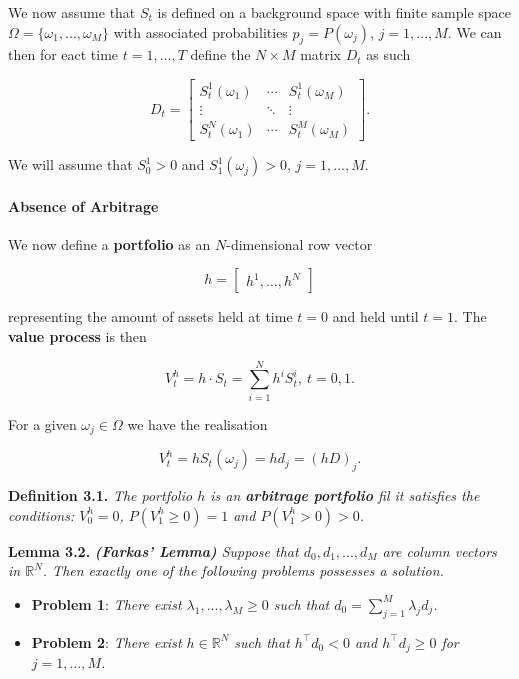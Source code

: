 \documentclass[
]{article}
\providecommand{\tightlist}{%
  \setlength{\itemsep}{0pt}\setlength{\parskip}{0pt}}
\begin{document}
We now assume that \(S_t\) is defined on a background space with finite
sample space \(\Omega = \{\omega_1,...,\omega_M\}\) with associated
probabilities \(p_j=P(\omega_j)\), \(j=1,...,M\). We can then for eact
time \(t=1,...,T\) define the \(N\times M\) matrix \(D_t\) as such

\[
D_t=\begin{bmatrix} S_t^1(\omega_1)&\cdots &S_t^1(\omega_M)\\
\vdots &\ddots & \vdots\\
S_t^N(\omega_1) &\cdots&S_t^M(\omega_M)\end{bmatrix}.
\]

We will assume that \(S_0^1>0\) and \(S_1^1(\omega_j)>0\),
\(j=1,...,M\).

\hypertarget{absence-of-arbitrage}{%
\paragraph{Absence of Arbitrage}\label{absence-of-arbitrage}}

We now define a \textbf{portfolio} as an \(N\)-dimensional row vector

\[
h=\begin{bmatrix} h^1, \dots,h^N\end{bmatrix}
\]

representing the amount of assets held at time \(t=0\) and held until
\(t=1\). The \textbf{value process} is then

\[
V^h_t=h\cdot S_t=\sum_{i=1}^N h^iS_t^i,\ t=0,1.\tag{3.1}
\]

For a given \(\omega_j\in\Omega\) we have the realisation

\[
V_t^h=hS_t(\omega_j)=hd_j=(hD)_j.
\]

\textbf{Definition 3.1.} \emph{The portfolio \(h\) is an
\textbf{arbitrage portfolio} fil it satisfies the conditions:
\(V_0^h=0\), \(P(V_1^h\ge 0)=1\) and \(P(V_1^h>0)>0\).}

\textbf{Lemma 3.2.} \emph{\textbf{(Farkas' Lemma)} Suppose that
\(d_0,d_1,...,d_M\) are column vectors in \(\mathbb{R}^N\). Then exactly
one of the following problems possesses a solution.}

\begin{itemize}
\tightlist
\item
  \textbf{Problem 1}: \emph{There exist \(\lambda_1,...,\lambda_M\ge0\)
  such that \(d_0=\sum_{j=1}^M\lambda_jd_j\).}
\item
  \textbf{Problem 2}: \emph{There exist \(h\in\mathbb{R}^N\) such that
  \(h^\top d_0<0\) and \(h^\top d_j\ge 0\) for \(j=1,...,M\).}
\end{itemize}
\end{document}
